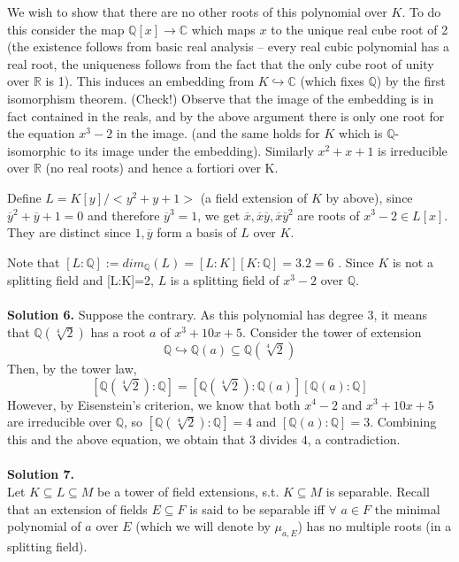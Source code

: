 \documentclass[12pt,a4paper]{article}
\begin{document}
We wish to show that there are no other roots of this polynomial over $K$. To do this consider the map $\mathbb{Q}[x]\xrightarrow{}\mathbb{C}$ which maps $x$ to the unique real cube root of 2 (the existence follows from basic real analysis -- every real cubic polynomial has a real root, the uniqueness follows from the fact that the only cube root of unity over $\mathbb{R}$ is 1). This induces an embedding from $K\hookrightarrow \mathbb{C}$ (which fixes $\mathbb{Q}$) by the first isomorphism theorem. (Check!) Observe that the image of the embedding is in fact contained in the reals, and by the above argument there is only one root for the equation $x^3-2$ in the image. (and the same holds for $K$ which is $\mathbb{Q}$-isomorphic to its image under the embedding). Similarly $x^2+x+1$ is irreducible over $\mathbb{R}$ (no real roots) and hence a fortiori over K. 

Define $L=K[y]/<y^2+y+1>$ (a field extension of $K$ by above), since $\overline{y}^2+\overline{y}+1=0$ and therefore $\overline{y}^3=1$, we get $\overline{x}, \overline{x}\overline{y}, \overline{x}\overline{y}^2$ are roots of $x^3-2\in L[x]$. They are distinct since $1,\overline{y}$ form a basis of $L$ over $K$.     

Note that $[L:\mathbb{Q}]:=dim_{\mathbb{Q}}(L)=[L:K][K:\mathbb{Q}]=3.2=6$ . Since $K$ is not a splitting field and [L:K]=2, $L$ is a splitting field of $x^3-2$ over $\mathbb{Q}$.\\
\\
\textbf{Solution 6.} Suppose the contrary. As this polynomial has degree $3$, it means that $\mathbb{Q}(\sqrt[4]{2})$ has a root $a$ of $x^3 + 10x + 5$. Consider the tower of extension \[ \mathbb{Q} \hookrightarrow \mathbb{Q}(a) \subseteq \mathbb{Q}(\sqrt[4]{2}) \] Then, by the tower law, \[ [\mathbb{Q}(\sqrt[4]{2}) : \mathbb{Q}] = [\mathbb{Q}(\sqrt[4]{2}) : \mathbb{Q}(a)][\mathbb{Q}(a) : \mathbb{Q}] \] However, by Eisenstein's criterion, we know that both $x^4 - 2$ and $x^3 + 10x + 5$ are irreducible over $\mathbb{Q}$, so $[\mathbb{Q}(\sqrt[4]{2}) : \mathbb{Q}] = 4$ and $[\mathbb{Q}(a) : \mathbb{Q}] = 3$. Combining this and the above equation, we obtain that $3$ divides $4$, a contradiction. \\
\\
\textbf{Solution 7.}\\

Let $K\subseteq L\subseteq M$ be a tower of field extensions, s.t. $K\subseteq M$ is separable. Recall that an extension of fields $E\subseteq F$ is said to be separable iff $\forall$ $a\in F$ the minimal polynomial of $a$ over $E$ (which we will denote by $\mu_{a,E}$) has no multiple roots (in a splitting field).
\end{document}
